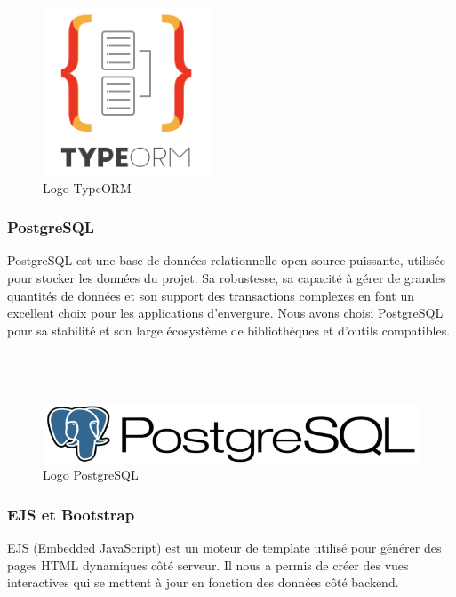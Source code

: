 {\begin{figure}[H]
\begin{center}
\includegraphics[width=5cm]{assets/presentation/TypeORM.png}
\end{center}
\caption{Logo TypeORM}
\end{figure}

\subsubsection*{PostgreSQL}
PostgreSQL est une base de données relationnelle open source puissante, utilisée pour stocker les données du projet. Sa robustesse, sa capacité à gérer de grandes quantités de données et son support des transactions complexes en font un excellent choix pour les applications d'envergure. Nous avons choisi PostgreSQL pour sa stabilité et son large écosystème de bibliothèques et d'outils compatibles.\\\\\\\\

\begin{figure}[H]
\begin{center}
\includegraphics[width=13cm]{assets/presentation/PostgreSQL_logo_Postgre_SQL-700x108.png}
\end{center}
\caption{Logo PostgreSQL}
\end{figure}


\subsubsection*{EJS et Bootstrap}
EJS (Embedded JavaScript) est un moteur de template utilisé pour générer des pages HTML dynamiques côté serveur. Il nous a permis de créer des vues interactives qui se mettent à jour en fonction des données côté backend. 

}
